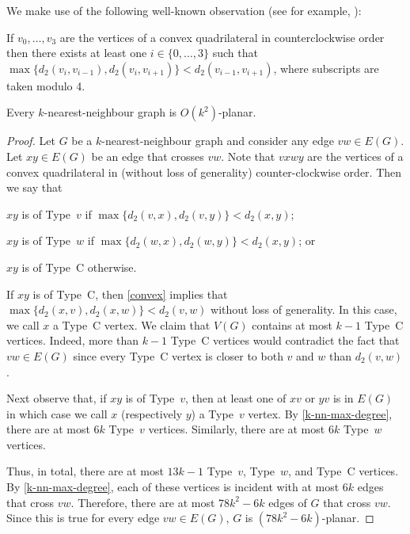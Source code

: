 \documentclass{patmorin}
\begin{document}
We make use of the following well-known observation (see for example, \citet[Lemma~2]{bose.morin.ea:routing}):
\begin{obs}
\label{convex}
If $v_0,\ldots,v_3$ are the vertices of a convex quadrilateral in counterclockwise order then there exists at least one $i\in\{0,\ldots,3\}$ such that $\max\{d_2(v_i,v_{i-1}), d_2(v_i,v_{i+1})\} < d_2(v_{i-1},v_{i+1})$, where subscripts are taken modulo 4.
\end{obs}

\begin{lem}
\label{nearest-neighbour}
  Every $k$-nearest-neighbour graph is $O(k^2)$-planar.
\end{lem}

\begin{proof}
  Let $G$ be a $k$-nearest-neighbour graph and consider any edge $vw\in E(G)$.
  Let $xy\in E(G)$ be an edge that crosses $vw$.  Note that $vxwy$ are the vertices of a convex quadrilateral in (without loss of generality) counter-clockwise order. Then we say that
  \begin{compactenum}
    \item $xy$ is of Type~$v$ if $\max\{d_2(v,x), d_2(v,y)\}< d_2(x,y)$;
    \item $xy$ is of Type~$w$ if $\max\{d_2(w,x), d_2(w,y)\}< d_2(x,y)$; or
    \item $xy$ is of Type~C otherwise.
  \end{compactenum}
  If $xy$ is of Type~C, then \cref{convex} implies that $\max\{d_2(x,v),d_2(x,w)\} < d_2(v,w)$ without loss of generality.
   In this case, we call $x$ a Type~C vertex.  We claim that $V(G)$ contains at most $k-1$ Type~C vertices.  Indeed, more than $k-1$ Type~C vertices would contradict the fact that $vw\in E(G)$ since every Type~C vertex is closer to both $v$ and $w$ than $d_2(v,w)$.

  Next observe that, if $xy$ is of Type~$v$, then at least one of $xv$ or $yv$ is in $E(G)$ in which case we call $x$ (respectively $y$) a Type~$v$ vertex.  By \cref{k-nn-max-degree}, there are at most $6k$ Type~$v$ vertices.  Similarly, there are at most $6k$ Type~$w$ vertices.

  Thus, in total, there are at most $13k-1$ Type~$v$, Type~$w$, and Type~C vertices. By \cref{k-nn-max-degree}, each of these vertices is incident with at most $6k$ edges that cross $vw$. Therefore, there are at most $78k^2-6k$ edges of $G$ that cross $vw$.  Since this is true for every edge $vw\in E(G)$, $G$ is $(78k^2-6k)$-planar.
\end{proof}
\end{document}
